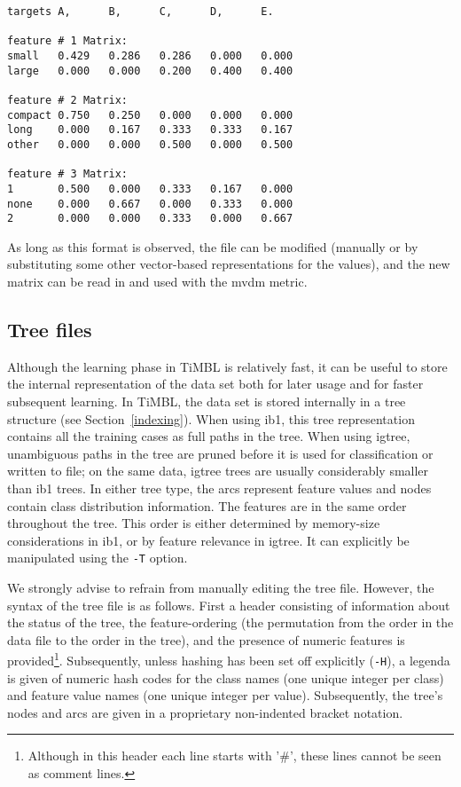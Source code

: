 \documentclass{report}
\begin{document}
\begin{footnotesize}
\begin{verbatim}
targets A,      B,      C,      D,      E.

feature # 1 Matrix: 
small   0.429   0.286   0.286   0.000   0.000
large   0.000   0.000   0.200   0.400   0.400
 
feature # 2 Matrix: 
compact 0.750   0.250   0.000   0.000   0.000
long    0.000   0.167   0.333   0.333   0.167
other   0.000   0.000   0.500   0.000   0.500
 
feature # 3 Matrix: 
1       0.500   0.000   0.333   0.167   0.000
none    0.000   0.667   0.000   0.333   0.000
2       0.000   0.000   0.333   0.000   0.667
\end{verbatim}
\end{footnotesize}

As long as this format is observed, the file can be modified (manually
or by substituting some other vector-based representations for the
values), and the new matrix can be read in and used with the {\sc
mvdm} metric.

\subsection{Tree files}
\label{treeformat}

Although the learning phase in TiMBL is relatively fast, it can be
useful to store the internal representation of the data set both for
later usage and for faster subsequent learning. In TiMBL, the data set
is stored internally in a tree structure (see
Section~\ref{indexing}). When using {\sc ib1}, this tree
representation contains all the training cases as full paths in the
tree. When using {\sc igtree}, unambiguous paths in the tree are
pruned before it is used for classification or written to file; on the
same data, {\sc igtree} trees are usually considerably smaller than
{\sc ib1} trees. In either tree type, the arcs represent feature
values and nodes contain class distribution information. The features
are in the same order throughout the tree. This order is either
determined by memory-size considerations in {\sc ib1}, or by feature
relevance in {\sc igtree}. It can explicitly be manipulated using the
{\tt -T} option.

We strongly advise to refrain from manually editing the tree
file. However, the syntax of the tree file is as follows. First a
header consisting of information about the status of the tree, the
feature-ordering (the permutation from the order in the data file to
the order in the tree), and the presence of numeric features is
provided\footnote{Although in this header each line starts with '\#',
  these lines cannot be seen as comment lines.}. Subsequently, unless
hashing has been set off explicitly ({\tt -H}), a legenda is given of
numeric hash codes for the class names (one unique integer per class)
and feature value names (one unique integer per value).  Subsequently,
the tree's nodes and arcs are given in a proprietary non-indented
bracket notation.
\end{document}
